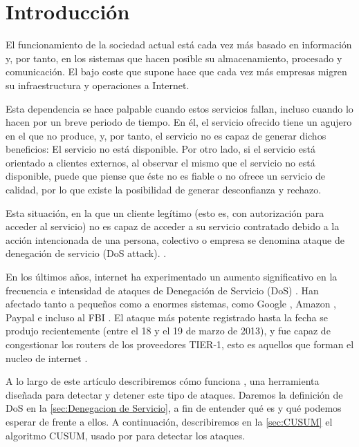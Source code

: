 \section{Introducción}\label{introduccion} %
El funcionamiento de la sociedad actual está cada vez más basado en 
información y, por tanto, en los sistemas que hacen posible su almacenamiento, procesado y comunicación. El bajo coste 
que supone hace que cada vez más empresas migren su infraestructura y operaciones a Internet.

Esta dependencia se hace palpable cuando estos servicios fallan, incluso cuando lo hacen por un breve periodo de tiempo. 
En él, el servicio ofrecido tiene un agujero en el que no produce, y, por tanto, el servicio no es capaz de generar 
dichos beneficios: El servicio no está disponible. Por otro lado, si el servicio está orientado a clientes externos, al 
observar el mismo que el servicio no está disponible, puede que piense que éste no es fiable o no ofrece un servicio 
de calidad, por lo que existe la posibilidad de generar desconfianza y rechazo.

Esta situación, en la que un cliente legítimo (esto es, con autorización para acceder al servicio) no es capaz de 
acceder a su servicio contratado debido a la acción intencionada de una persona, colectivo o empresa se denomina ataque 
de denegación de servicio (DoS attack). \cite{Raghavan}.

En los últimos años, internet ha experimentado un aumento significativo en la frecuencia e intensidad de ataques de 
Denegación de Servicio (DoS) \cite{kakaspersky_2H2011_DDoS_analisis}. Han afectado tanto a pequeños como a enormes 
sistemas, como Google \cite{Google+_DDoS_attack}, Amazon \cite{Amazon_DDoS_attack}, Paypal e incluso al FBI 
\cite{FBI_DDoS_attack}. El ataque más potente registrado hasta la fecha se produjo recientemente (entre el 18 y el 19 de 
marzo de 2013), y fue capaz de congestionar los routers de los proveedores TIER-1, esto es aquellos que
forman el nucleo de internet \cite{spamhaus_DDoS_attack}. 

A lo largo de este artículo describiremos cómo funciona \redborderddos, una herramienta diseñada 
para detectar y detener este tipo de ataques. Daremos la
definición de \gls{DoS} en la \autoref{sec:Denegacion de Servicio},
a fin de entender qué es y qué podemos esperar de \redborderddos{}
frente a ellos. A continuación, describiremos en la 
\autoref{sec:CUSUM} el algoritmo
CUSUM, usado por \redborderddos{} para detectar los ataques.

